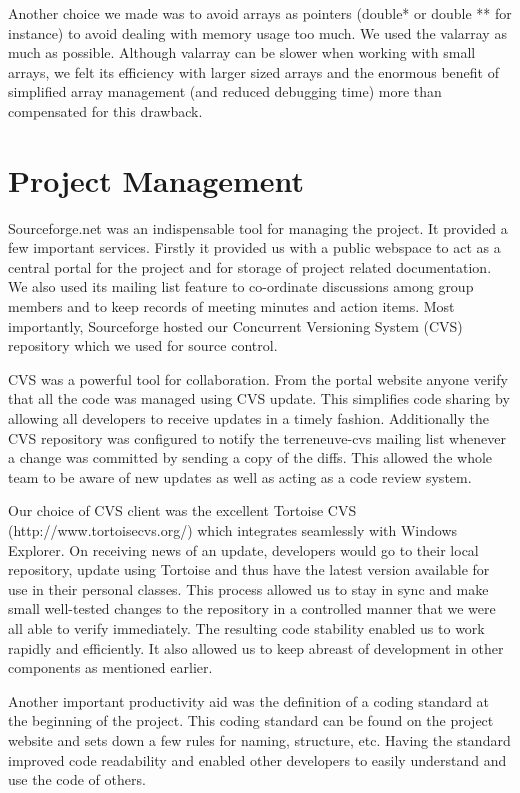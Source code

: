 Another choice we made was to avoid arrays as pointers (double* or double ** for instance) to avoid dealing with memory usage too much. We used the valarray as much as possible.  Although valarray can be slower when working with small arrays, we felt its efficiency with larger sized arrays and the enormous benefit of simplified array management (and reduced debugging time) more than compensated for this drawback.

\section{Project Management}

Sourceforge.net was an indispensable tool for managing the project.  It provided a few important services.  Firstly it provided us with a public webspace to act as a central portal for the project and for storage of project related documentation.  We also used its mailing list feature to co-ordinate discussions among group members and to keep records of meeting minutes and action items.  Most importantly, Sourceforge hosted our Concurrent Versioning System (CVS) repository which we used for source control.  

CVS was a powerful tool for collaboration.  From the portal website anyone verify that all the code was managed using CVS update.  This simplifies code sharing by allowing all developers to receive updates in a timely fashion.  Additionally the CVS repository was configured to notify the terreneuve-cvs mailing list whenever a change was committed by sending a copy of the diffs.  This allowed the whole team to be aware of new updates as well as acting as a code review system.  

Our choice of CVS client was the excellent Tortoise CVS (http://www.tortoisecvs.org/) which integrates seamlessly with Windows Explorer. On receiving news of an update, developers would go to their local repository, update using Tortoise and thus have the latest version available for use in their personal classes.  This process allowed us to stay in sync and make small well-tested changes to the repository in a controlled manner that we were all able to verify immediately.  The resulting code stability enabled us to work rapidly and efficiently.  It also allowed us to keep abreast of development in other components as mentioned earlier.

Another important productivity aid was the definition of a coding standard at the beginning of the project.  This coding standard can be found on the project website and sets down a few rules for naming, structure, etc.  Having the standard improved code readability and enabled other developers to easily understand and use the code of others.  

